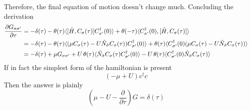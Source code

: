 \documentclass{article}
\begin{document}
Therefore, the final equation of motion doesn't change much. Concluding the derivation
\begin{align*}
\frac{\partial G_{\sigma\sigma'}}{\partial \tau} &= -\delta(\tau) -\operatorname{\theta}(\tau)\langle [\hat{H}, C_\sigma(\tau)]C_{\sigma'}^\dagger(0) \rangle + \operatorname{\theta}(-\tau)\langle C_{\sigma'}^\dagger(0),[\hat{H}, C_\sigma(\tau)] \rangle  \\
&= -\delta(\tau) - \operatorname{\theta}(\tau)\langle (\mu C_\sigma(\tau) - U\hat{N}_{\bar{\sigma}}C_\sigma(\tau))C_{\sigma'}^\dagger(0) \rangle + \operatorname{\theta}(\tau)\langle C_{\sigma'}^\dagger(0) (\mu C_\sigma(\tau) - U\hat{N}_{\bar{\sigma}}C_\sigma(\tau)) \rangle \\
&= -\delta(\tau) +\mu G_{\sigma\sigma'} + U\operatorname{\theta}(\tau)\langle \hat{N}_{\bar{\sigma}}C_\sigma(\tau)C_{\sigma'}^\dagger(0) \rangle - U\operatorname{\theta}(\tau)\langle C_{\sigma'}^\dagger(0)\hat{N}_{\bar{\sigma}}C_\sigma(\tau) \rangle \\
\end{align*}
If in fact the simplest form of the hamiltonian is present 
\begin{equation*} (-\mu + U)c^\dagger c \end{equation*}
Then the answer is plainly
\begin{equation*} (\mu - U - \frac{\partial}{\partial \tau})G= \delta(\tau) \end{equation*}
\end{document}
